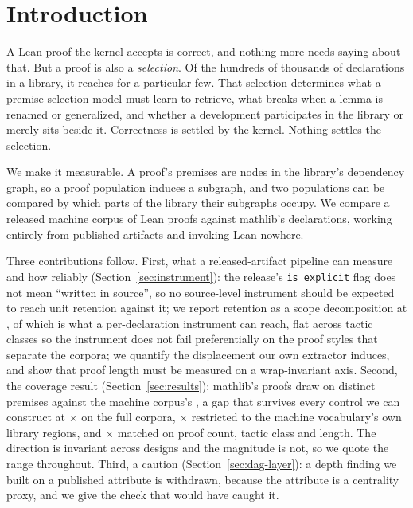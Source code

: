 
\section{Introduction}
\label{sec:intro}

A Lean proof the kernel accepts is correct, and nothing more needs saying about
that. But a proof is also a \emph{selection}. Of the hundreds of thousands of
declarations in a library, it reaches for a particular few. That selection
determines what a premise-selection model must learn to retrieve, what breaks
when a lemma is renamed or generalized, and whether a development participates
in the library or merely sits beside it. Correctness is settled by the kernel. Nothing settles the selection.

We make it measurable. A proof's premises are nodes in the library's dependency
graph, so a proof population induces a subgraph, and two populations can be
compared by which parts of the library their subgraphs occupy. We compare a
released machine corpus of \machineProofs{} Lean proofs against mathlib's
\humanProofs{} declarations, working entirely from published artifacts and
invoking Lean nowhere.

Three contributions follow. First, what a released-artifact pipeline can
measure and how reliably (Section~\ref{sec:instrument}): the release's
\texttt{is\_explicit} flag does not mean ``written in source'', so no
source-level instrument should be expected to reach unit retention against it;
we report retention as a scope decomposition at \retention{}, of which
\efficiencyReachable{} is what a per-declaration instrument can reach, flat
across tactic classes so the instrument does not fail preferentially on the
proof styles that separate the corpora; we quantify the displacement our own
extractor induces, and show that proof length must be measured on a
wrap-invariant axis. Second, the coverage result
(Section~\ref{sec:results}): mathlib's proofs draw on \humanVocab{} distinct
premises against the machine corpus's \machineVocab{}, a gap that survives
every control we can construct at \vocabRatio{}$\times$ on the full corpora,
\areaRestrictedRatio{}$\times$ restricted to the machine vocabulary's own
library regions, and \vocabRatioMatched{}$\times$ matched on proof count,
tactic class and length. The direction is invariant across designs and the
magnitude is not, so we quote the range throughout. Third, a caution
(Section~\ref{sec:dag-layer}): a depth finding we built on a published
attribute is withdrawn, because the attribute is a centrality proxy, and we
give the check that would have caught it.

